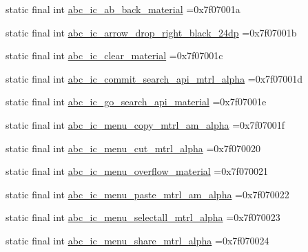 \begin{DoxyCompactItemize}
\item 
static final int \mbox{\hyperlink{classbr_1_1unb_1_1cic_1_1mp_1_1marketmaster_1_1R_1_1drawable_a30cd354e4695e8cdfb62fba9228284ef}{abc\+\_\+ic\+\_\+ab\+\_\+back\+\_\+material}} =0x7f07001a
\item 
static final int \mbox{\hyperlink{classbr_1_1unb_1_1cic_1_1mp_1_1marketmaster_1_1R_1_1drawable_a955ba7475a8b0dc0bad08e93624a9eab}{abc\+\_\+ic\+\_\+arrow\+\_\+drop\+\_\+right\+\_\+black\+\_\+24dp}} =0x7f07001b
\item 
static final int \mbox{\hyperlink{classbr_1_1unb_1_1cic_1_1mp_1_1marketmaster_1_1R_1_1drawable_a8225beb1a2f4bb4c215a7cdc05ac4a09}{abc\+\_\+ic\+\_\+clear\+\_\+material}} =0x7f07001c
\item 
static final int \mbox{\hyperlink{classbr_1_1unb_1_1cic_1_1mp_1_1marketmaster_1_1R_1_1drawable_a64f3208351224f4a3caad6c13fad1f28}{abc\+\_\+ic\+\_\+commit\+\_\+search\+\_\+api\+\_\+mtrl\+\_\+alpha}} =0x7f07001d
\item 
static final int \mbox{\hyperlink{classbr_1_1unb_1_1cic_1_1mp_1_1marketmaster_1_1R_1_1drawable_ac0cc5b4a7c3dde512f9c62c39fe5e5e7}{abc\+\_\+ic\+\_\+go\+\_\+search\+\_\+api\+\_\+material}} =0x7f07001e
\item 
static final int \mbox{\hyperlink{classbr_1_1unb_1_1cic_1_1mp_1_1marketmaster_1_1R_1_1drawable_a3cc713e97ed2e53c9e8cf5609f6dceed}{abc\+\_\+ic\+\_\+menu\+\_\+copy\+\_\+mtrl\+\_\+am\+\_\+alpha}} =0x7f07001f
\item 
static final int \mbox{\hyperlink{classbr_1_1unb_1_1cic_1_1mp_1_1marketmaster_1_1R_1_1drawable_ae6a7faee594b09453f15a7525ffd883a}{abc\+\_\+ic\+\_\+menu\+\_\+cut\+\_\+mtrl\+\_\+alpha}} =0x7f070020
\item 
static final int \mbox{\hyperlink{classbr_1_1unb_1_1cic_1_1mp_1_1marketmaster_1_1R_1_1drawable_ae74d87c479b2cabe926f303fb1c997e5}{abc\+\_\+ic\+\_\+menu\+\_\+overflow\+\_\+material}} =0x7f070021
\item 
static final int \mbox{\hyperlink{classbr_1_1unb_1_1cic_1_1mp_1_1marketmaster_1_1R_1_1drawable_a03d84d008f806be39979c0a93ada1475}{abc\+\_\+ic\+\_\+menu\+\_\+paste\+\_\+mtrl\+\_\+am\+\_\+alpha}} =0x7f070022
\item 
static final int \mbox{\hyperlink{classbr_1_1unb_1_1cic_1_1mp_1_1marketmaster_1_1R_1_1drawable_aef9b82f9664e3fa5694a96362c3887d2}{abc\+\_\+ic\+\_\+menu\+\_\+selectall\+\_\+mtrl\+\_\+alpha}} =0x7f070023
\item 
static final int \mbox{\hyperlink{classbr_1_1unb_1_1cic_1_1mp_1_1marketmaster_1_1R_1_1drawable_a4f30e4e23c183c9a00b065ef6cf000ca}{abc\+\_\+ic\+\_\+menu\+\_\+share\+\_\+mtrl\+\_\+alpha}} =0x7f070024

\end{DoxyCompactItemize}
